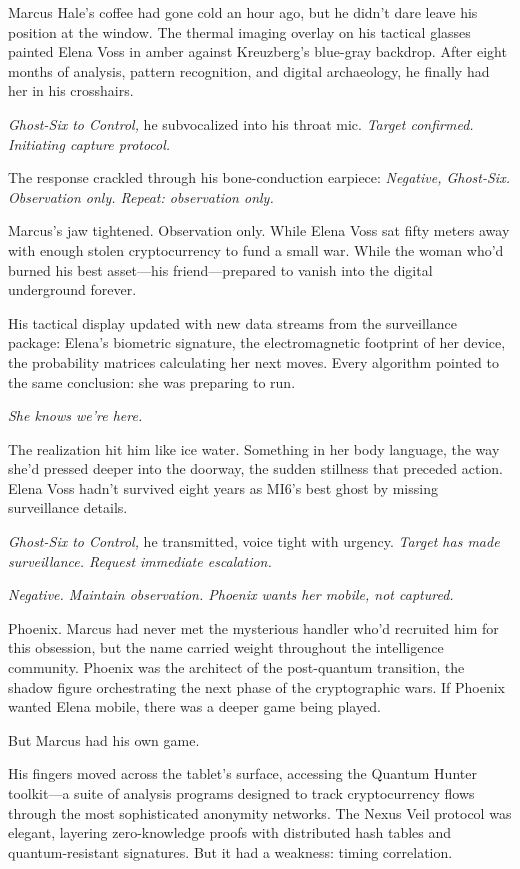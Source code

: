 Marcus Hale's coffee had gone cold an hour ago, but he didn't dare leave his position at the window. The thermal imaging overlay on his tactical glasses painted Elena Voss in amber against Kreuzberg's blue-gray backdrop. After eight months of analysis, pattern recognition, and digital archaeology, he finally had her in his crosshairs.

\emph{Ghost-Six to Control,} he subvocalized into his throat mic. \emph{Target confirmed. Initiating capture protocol.}

The response crackled through his bone-conduction earpiece: \emph{Negative, Ghost-Six. Observation only. Repeat: observation only.}

Marcus's jaw tightened. Observation only. While Elena Voss sat fifty meters away with enough stolen cryptocurrency to fund a small war. While the woman who'd burned his best asset---his friend---prepared to vanish into the digital underground forever.

His tactical display updated with new data streams from the surveillance package: Elena's biometric signature, the electromagnetic footprint of her device, the probability matrices calculating her next moves. Every algorithm pointed to the same conclusion: she was preparing to run.

\emph{She knows we're here.}

The realization hit him like ice water. Something in her body language, the way she'd pressed deeper into the doorway, the sudden stillness that preceded action. Elena Voss hadn't survived eight years as MI6's best ghost by missing surveillance details.

\emph{Ghost-Six to Control,} he transmitted, voice tight with urgency. \emph{Target has made surveillance. Request immediate escalation.}

\emph{Negative. Maintain observation. Phoenix wants her mobile, not captured.}

Phoenix. Marcus had never met the mysterious handler who'd recruited him for this obsession, but the name carried weight throughout the intelligence community. Phoenix was the architect of the post-quantum transition, the shadow figure orchestrating the next phase of the cryptographic wars. If Phoenix wanted Elena mobile, there was a deeper game being played.

But Marcus had his own game.

His fingers moved across the tablet's surface, accessing the Quantum Hunter toolkit---a suite of analysis programs designed to track cryptocurrency flows through the most sophisticated anonymity networks. The Nexus Veil protocol was elegant, layering zero-knowledge proofs with distributed hash tables and quantum-resistant signatures. But it had a weakness: timing correlation.

